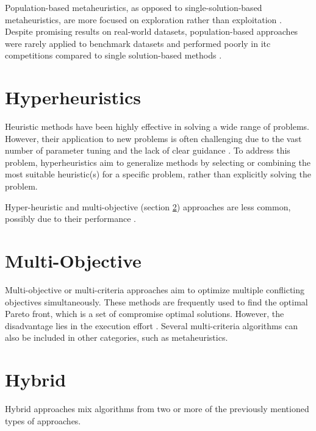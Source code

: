 Population-based metaheuristics, as opposed to single-solution-based metaheuristics, are more focused on exploration rather than exploitation \cite{talbi2009metaheuristics,du2016search}. Despite promising results on real-world datasets, population-based approaches were rarely applied to benchmark datasets and performed poorly in \ac{itc} competitions compared to single solution-based methods \cite{abdipoor_meta-heuristic_2023}.


\section{Hyperheuristics}

Heuristic methods have been highly effective in solving a wide range of problems. However, their application to new problems is often challenging due to the vast number of parameter tuning and the lack of clear guidance \cite{hyper_heuristics_survey}. To address this problem, hyperheuristics aim to generalize methods by selecting or combining the most suitable heuristic(s) for a specific problem, rather than explicitly solving the problem.

Hyper-heuristic and multi-objective (section \ref{sec:mo}) approaches are less common, possibly due to their performance \cite{chen_survey_2021}.

\section{Multi-Objective}\label{sec:mo}

Multi-objective or multi-criteria approaches aim to optimize multiple conflicting objectives simultaneously. These methods are frequently used to find the optimal Pareto front, which is a set of compromise optimal solutions. However, the disadvantage lies in the execution effort \cite{chen_survey_2021}. Several multi-criteria algorithms can also be included in other categories, such as metaheuristics.

\section{Hybrid}

Hybrid approaches mix algorithms from two or more of the previously mentioned types of approaches.

